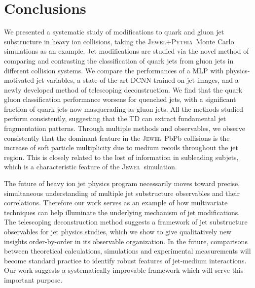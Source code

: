 \documentclass[notoc]{JHEP3}
\newcommand{\jw}{\textsc{Jewel}~}
\newcommand{\jwpy}{\textsc{Jewel+Pythia}~}
\begin{document}
\section{Conclusions}
\label{sec:conc}

We presented a systematic study of modifications to quark and gluon jet substructure in heavy ion collisions, taking the \jwpy Monte Carlo simulations as an example. Jet modifications are studied via the novel method of comparing and contrasting the classification of quark jets from gluon jets in different collision systems. We compare the performances of a MLP with physics-motivated jet variables, a state-of-the-art DCNN trained on jet images, and a newly developed method of telescoping deconstruction. We find that the quark gluon classification performance worsens for quenched jets, with a significant fraction of quark jets now masquerading as gluon jets. All the methods studied perform consistently, suggesting that the TD can extract fundamental jet fragmentation patterns. Through multiple methods and observables, we observe consistently that the dominant feature in the \jw PbPb collisions is the increase of soft particle multiplicity due to medium recoils throughout the jet region. This is closely related to the lost of information in subleading subjets, which is a characteristic feature of the \jw simulation.

The future of heavy ion jet physics program necessarily moves toward precise, simultaneous understanding of multiple jet substructure observables and their correlations. Therefore our work serves as an example of how multivariate techniques can help illuminate the underlying mechanism of jet modifications. The telescoping deconstruction method suggests a framework of jet substructure observables for jet physics studies, which we show to give qualitatively new insights order-by-order in its observable organization. In the future, comparisons between theoretical calculations, simulations and experimental measurements will become standard practice to identify robust features of jet-medium interactions. Our work suggests a systematically improvable framework which will serve this important purpose.
\end{document}
